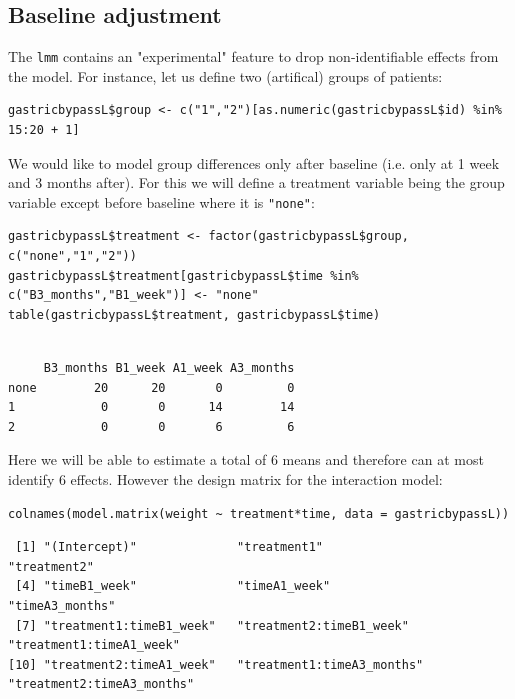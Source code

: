 \documentclass[12pt]{article}
\begin{document}
\clearpage

\subsection{Baseline adjustment}
\label{sec:org654df86}

The \texttt{lmm} contains an "experimental" feature to drop non-identifiable
effects from the model. For instance, let us define two (artifical) groups of
patients:
\lstset{language=r,label= ,caption= ,captionpos=b,numbers=none}
\begin{lstlisting}
gastricbypassL$group <- c("1","2")[as.numeric(gastricbypassL$id) %in% 15:20 + 1]
\end{lstlisting}
We would like to model group differences only after baseline
(i.e. only at 1 week and 3 months after). For this we will define a
treatment variable being the group variable except before baseline where
it is \texttt{"none"}:
\lstset{language=r,label= ,caption= ,captionpos=b,numbers=none}
\begin{lstlisting}
gastricbypassL$treatment <- factor(gastricbypassL$group, c("none","1","2"))
gastricbypassL$treatment[gastricbypassL$time %in% c("B3_months","B1_week")] <- "none"
table(gastricbypassL$treatment, gastricbypassL$time)
\end{lstlisting}

\begin{verbatim}

     B3_months B1_week A1_week A3_months
none        20      20       0         0
1            0       0      14        14
2            0       0       6         6
\end{verbatim}


Here we will be able to estimate a total of 6 means and therefore can
at most identify 6 effects. However the design matrix for the
interaction model:
\lstset{language=r,label= ,caption= ,captionpos=b,numbers=none}
\begin{lstlisting}
colnames(model.matrix(weight ~ treatment*time, data = gastricbypassL))
\end{lstlisting}

\begin{verbatim}
 [1] "(Intercept)"              "treatment1"               "treatment2"              
 [4] "timeB1_week"              "timeA1_week"              "timeA3_months"           
 [7] "treatment1:timeB1_week"   "treatment2:timeB1_week"   "treatment1:timeA1_week"  
[10] "treatment2:timeA1_week"   "treatment1:timeA3_months" "treatment2:timeA3_months"
\end{verbatim}
\end{document}

